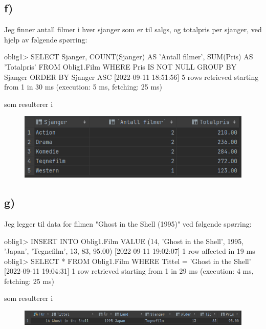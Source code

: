 \documentclass[%
notitlepage,
 amsmath,amssymb,
 aps,
rmp,
]{revtex4-2}  %
\begin{document}
\subsection*{f)}
Jeg finner antall filmer i hver sjanger som er til salgs, og totalpris per sjanger, ved hjelp av følgende spørring:
\begin{sql}
oblig1> SELECT Sjanger, COUNT(Sjanger) AS 'Antall filmer', SUM(Pris) AS 'Totalpris'
        FROM Oblig1.Film
        WHERE Pris IS NOT NULL
        GROUP BY Sjanger
        ORDER BY Sjanger ASC
[2022-09-11 18:51:56] 5 rows retrieved starting from 1 in 30 ms (execution: 5 ms, fetching: 25 ms)
\end{sql}
som resulterer i
\begin{figure}[H]
\centering\includegraphics[width=\columnwidth]{op1f.png}
\end{figure}

\subsection*{g)}
Jeg legger til data for filmen "Ghost in the Shell (1995)" ved følgende spørring:
\begin{sql}
oblig1> INSERT INTO Oblig1.Film
        VALUE (14, 'Ghost in the Shell', 1995, 'Japan', 'Tegnefilm', 13, 83, 95.00)
[2022-09-11 19:02:07] 1 row affected in 19 ms
oblig1> SELECT * FROM Oblig1.Film
        WHERE Tittel = 'Ghost in the Shell'
[2022-09-11 19:04:31] 1 row retrieved starting from 1 in 29 ms (execution: 4 ms, fetching: 25 ms)
\end{sql}
som resulterer i
\begin{figure}[H]
\centering\includegraphics[width=\columnwidth]{op1g.png}
\end{figure}

\newpage
\end{document}
